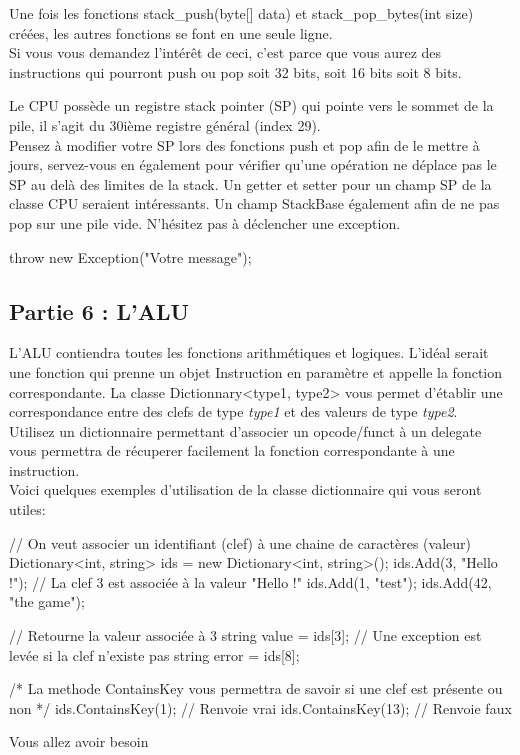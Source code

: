 Une fois les fonctions stack\_push(byte[] data) et stack\_pop\_bytes(int size) créées, les autres fonctions se font en une seule ligne.\\
Si vous vous demandez l'intérêt de ceci, c'est parce que vous aurez des instructions qui pourront push ou pop soit 32 bits, soit 16 bits soit 8 bits.

Le CPU possède un registre stack pointer (SP) qui pointe vers le sommet de la pile, il s'agit du 30ième registre général (index 29).\\
Pensez à modifier votre SP lors des fonctions push et pop afin de le mettre à jours, servez-vous en également pour vérifier qu'une opération ne déplace pas le SP au delà des limites de la stack. Un getter et setter pour un champ SP de la classe CPU seraient intéressants. Un champ StackBase également afin de ne pas pop sur une pile vide. N'hésitez pas à déclencher une exception.
\begin{code}
throw new Exception("Votre message");
\end{code}

\subsection{Partie 6 : L'ALU}

L'ALU contiendra toutes les fonctions arithmétiques et logiques. L'idéal serait une fonction qui prenne un objet Instruction en paramètre et appelle la fonction correspondante.
La classe Dictionnary<type1, type2> vous permet d'établir une correspondance entre des clefs de type \textit{type1} et des valeurs de type \textit{type2}.\\
Utilisez un dictionnaire permettant d'associer un opcode/funct à un delegate vous permettra de récuperer facilement la fonction correspondante à une instruction.\\
Voici quelques exemples d'utilisation de la classe dictionnaire qui vous seront utiles:
\begin{code}
// On veut associer un identifiant (clef) à une chaine de caractères (valeur)
Dictionary<int, string> ids = new Dictionary<int, string>();
ids.Add(3, "Hello !"); // La clef 3 est associée à la valeur "Hello !"
ids.Add(1, "test");
ids.Add(42, "the game");

// Retourne la valeur associée à 3
string value = ids[3];
// Une exception est levée si la clef n'existe pas
string error = ids[8];

/*
  La methode ContainsKey vous permettra de savoir
  si une clef est présente ou non
*/
ids.ContainsKey(1); // Renvoie vrai
ids.ContainsKey(13); // Renvoie faux
\end{code}

Vous allez avoir besoin 

